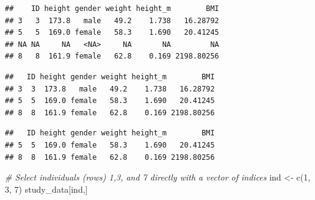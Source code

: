 \documentclass[
]{book}
\newenvironment{Shaded}{\begin{snugshade}}{\end{snugshade}}
\newcommand{\CommentTok}[1]{\textcolor[rgb]{0.56,0.35,0.01}{\textit{#1}}}
\newcommand{\DecValTok}[1]{\textcolor[rgb]{0.00,0.00,0.81}{#1}}
\newcommand{\FunctionTok}[1]{\textcolor[rgb]{0.00,0.00,0.00}{#1}}
\newcommand{\NormalTok}[1]{#1}
\newcommand{\OtherTok}[1]{\textcolor[rgb]{0.56,0.35,0.01}{#1}}
\newcommand{\SpecialCharTok}[1]{\textcolor[rgb]{0.00,0.00,0.00}{#1}}
\newcommand{\StringTok}[1]{\textcolor[rgb]{0.31,0.60,0.02}{#1}}
\begin{document}
\begin{verbatim}
##    ID height gender weight height_m        BMI
## 3   3  173.8   male   49.2    1.738   16.28792
## 5   5  169.0 female   58.3    1.690   20.41245
## NA NA     NA   <NA>     NA       NA         NA
## 8   8  161.9 female   62.8    0.169 2198.80256
\end{verbatim}

\begin{Shaded}
\end{Shaded}

\begin{verbatim}
##   ID height gender weight height_m        BMI
## 3  3  173.8   male   49.2    1.738   16.28792
## 5  5  169.0 female   58.3    1.690   20.41245
## 8  8  161.9 female   62.8    0.169 2198.80256
\end{verbatim}

\begin{Shaded}
\end{Shaded}

\begin{verbatim}
##   ID height gender weight height_m        BMI
## 5  5  169.0 female   58.3    1.690   20.41245
## 8  8  161.9 female   62.8    0.169 2198.80256
\end{verbatim}

\begin{Shaded}
\begin{Highlighting}[]
\CommentTok{\# Select individuals (rows) 1,3, and 7 directly with a vector of indices}
\NormalTok{ind }\OtherTok{\textless{}{-}} \FunctionTok{c}\NormalTok{(}\DecValTok{1}\NormalTok{, }\DecValTok{3}\NormalTok{, }\DecValTok{7}\NormalTok{)}
\NormalTok{study\_data[ind,]}
\end{Highlighting}
\end{Shaded}
\end{document}
